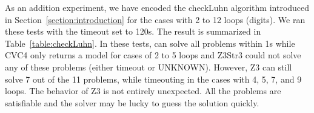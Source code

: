 
As an addition experiment, we have encoded the checkLuhn algorithm introduced in Section~\ref{section:introduction} for the cases with 2 to 12 loops (digits). We ran these tests 
with the timeout set to 120s. The result is summarized in Table~\ref{table:checkLuhn}.
In these tests, {\tool} can solve all problems within 1s while CVC4 only returns a model for cases of 2 to 5 loops and Z3Str3 could not solve any of these problems (either timeout or UNKNOWN). However, Z3 can still solve 7 out of the 11 problems, while timeouting in the cases with 4, 5, 7, and 9 loops. The behavior of Z3 is not entirely unexpected. All the problems are satisfiable and the solver may be lucky to guess the solution quickly. %


